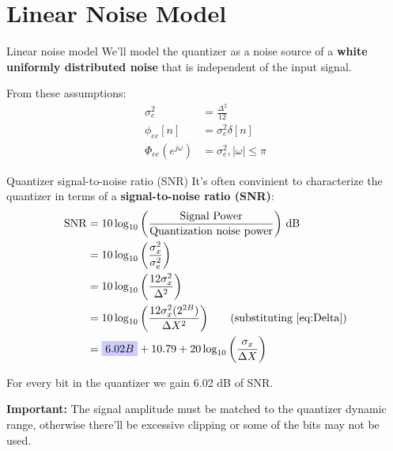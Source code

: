 \documentclass[10pt]{beamer}
\begin{document}
%
\section{Linear Noise Model}
\begin{frame}{Linear noise model}
We'll model the quantizer as a noise source of a \textbf{white uniformly distributed noise} that is independent of the input signal. 

\begin{center}
	\resizebox{0.6\textwidth}{!}{}
\end{center}
\vspace{-0.5cm}
\pause
From these assumptions:
\begin{align*}
\sigma_e^2 &= \frac{\Delta^2}{12} \tag{average power} \\
\phi_{ee}[n] &= \sigma_e^2\delta[n] \tag{autocorrelation function} \\
\Phi_{ee}(e^{j\omega}) &= \sigma_e^2, |\omega| \leq \pi \tag{PSD}
\end{align*}
\end{frame}

%
\begin{frame}{Quantizer signal-to-noise ratio (SNR)}
It's often convinient to characterize the quantizer in terms of a \textbf{signal-to-noise ratio (SNR)}:
\begin{align*}
\mathrm{SNR} &= 10\log_{10}\bigg(\frac{\text{Signal Power}}{\text{Quantization noise power}}\bigg)~\text{dB} \\
&= 10\log_{10}\bigg(\frac{\sigma_x^2}{\sigma_e^2}\bigg) \\
&= 10\log_{10}\bigg(\frac{12\sigma_x^2}{\Delta^2}\bigg) \\
&= 10\log_{10}\bigg(\frac{12\sigma_x^2(2^{2B})}{\Delta X^2}\bigg) \tag{substituting \eqref{eq:Delta}} \\
&= \tikz[baseline]{\node[fill=blue!20,anchor=base] {$6.02B$};} + 10.79  + 20\log_{10}\bigg(\frac{\sigma_x}{\Delta X}\bigg) 
\end{align*}

For every bit in the quantizer we gain 6.02 dB of SNR.

\textbf{Important:} The signal amplitude must be matched to the quantizer dynamic range, otherwise there'll be excessive clipping or some of the bits may not be used. 
\end{frame}
\end{document}
